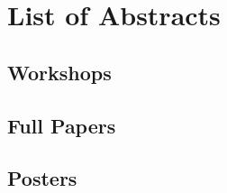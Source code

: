 \documentclass[openany, parskip=full, 12pt, a4]{scrbook}
\begin{document}
\chapter{List of Abstracts}

\section{Workshops}








\section{Full Papers}
















\vspace{-2.5em}

\section{Posters}
\end{document}
